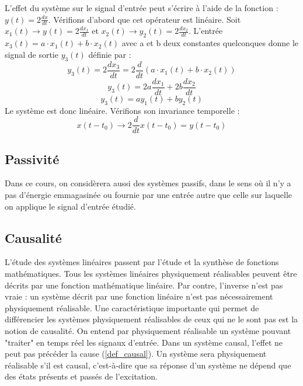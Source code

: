 \documentclass[]{book}
\begin{document}
{	
	L'effet du système sur le signal d'entrée peut s'écrire à l'aide de la fonction : $y(t)=2\frac{dx}{dt}$.
	Vérifions d'abord que cet opérateur est linéaire. Soit $ x_{1}(t)\rightarrow y_{}(t)=2\frac{dx_{1}}{dt}$ et  $ x_{2}(t)\rightarrow y_{2}(t)=2\frac{dx_{2}}{dt}$. L'entrée $x_{3}(t)=a\cdot x_{1}(t)+b\cdot x_{2}(t) $ avec a et b deux constantes quelconques donne le signal de sortie $y_{3}(t)$ définie par :
	\begin{equation*}
	y_{3}(t)=2\frac{dx_{3}}{dt}=2\frac{d}{dt}(a\cdot x_{1}(t)+b\cdot x_{2}(t))
	\end{equation*}
	\begin{equation*}
	y_{3}(t)=2a\frac{dx_{1}}{dt}+2b\frac{dx_{2}}{dt}
	\end{equation*}
	\begin{equation*}
	y_{3}(t)=ay_{1}(t)+by_{2}(t)
	\end{equation*}
	Le système est donc linéaire. Vérifions son invariance temporelle :
	\begin{equation*}
	x(t-t_{0}) \rightarrow 2\frac{d}{dt}x(t-t_{0})=y(t-t_{0})
	\end{equation*}
	
	
	\subsection{Passivité}
	Dans ce cours, on considèrera aussi des systèmes passifs, dans le sens où il n'y a pas d'énergie emmagasinée ou fournie par une entrée autre que celle sur laquelle on applique le signal d'entrée étudié.
	\subsection{Causalité}
	L'étude des systèmes linéaires passent par l'étude et la synthèse de fonctions mathématiques. Tous les systèmes linéaires physiquement réalisables peuvent être décrits par une fonction mathématique linéaire. Par contre, l'inverse n'est pas vraie : un système décrit par une fonction linéaire n'est pas nécessairement physiquement réalisable. Une caractéristique importante qui permet de différencier les systèmes physiquement réalisables de ceux qui ne le sont pas est la notion de causalité. On entend par physiquement réalisable un système pouvant "traiter" en temps réel les signaux d'entrée.
	Dans un système causal, l'effet ne peut pas précéder la cause (\ref{def_causal}). Un système sera physiquement réalisable s'il est causal, c'est-à-dire que sa réponse d'un système ne dépend que des états présents et passés de l'excitation.
	
}
\end{document}
